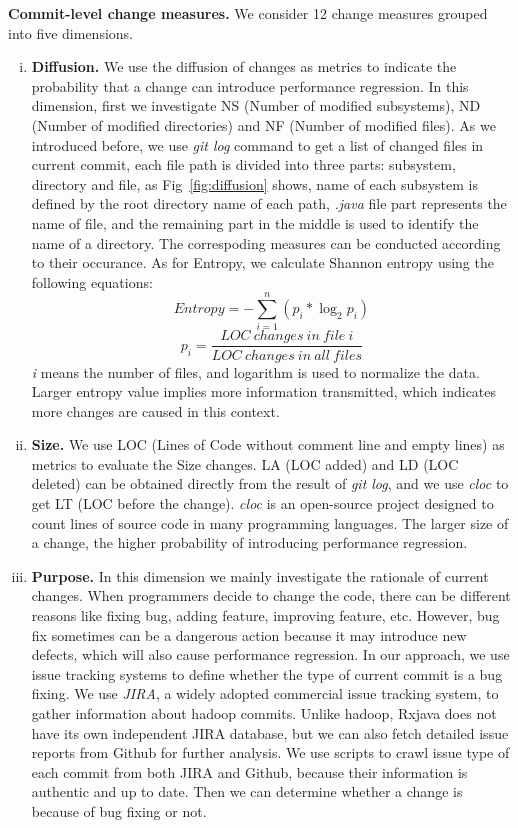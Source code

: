  \textbf{Commit-level change measures.} We consider 12 change measures grouped into five dimensions.
\begin{enumerate}[(i)]
	\item \noindent
	\textbf{Diffusion.} We use the diffusion of changes as metrics to indicate the probability that a change can introduce performance regression. In this dimension, first we investigate NS (Number of modified subsystems), ND (Number of modified directories) and NF (Number of modified files). As we introduced before, we use \textit{git log} command to get a list of changed files in current commit, each file path is divided into three parts: subsystem, directory and file, as Fig~\ref{fig:diffusion} shows, name of each subsystem is defined by the root directory name of each path, \textit{.java} file part represents the name of file, and the remaining part in the middle is used to identify the name of a directory. The correspoding measures can be conducted according to their occurance. As for Entropy, we calculate Shannon entropy using the following equations:
	\begin{equation}
		Entropy = - \sum_{i=1}^{n}\left (p_{i}\ast \log_2 p_{i} \right )
	\end{equation}
	\begin{equation}
		p_{i} =\frac{LOC\ changes\ in\ file\ i}{LOC\ changes\ in\ all\ files}
	\end{equation}
	\textit{i} means the number of files, and logarithm is used to normalize the data. Larger entropy value implies more information transmitted, which indicates more changes are caused in this context.
	
	\item \noindent
	\textbf{Size.}
	We use LOC (Lines of Code without comment line and empty lines) as metrics to evaluate the Size changes. LA (LOC added) and LD (LOC deleted) can be obtained directly from the result of \textit{git log}, and we use \textit{cloc} to get LT (LOC before the change). \textit{cloc} is an open-source project designed to count lines of source code in many programming languages. The larger size of a change,  the higher probability of introducing performance regression.
	
	\item \noindent
	\textbf{Purpose.}
	In this dimension we mainly investigate the rationale of current changes. When programmers decide to change the code, there can be different reasons like fixing bug, adding feature, improving feature, etc.
	However, bug fix sometimes can be a dangerous action because it may introduce new defects, which will also cause performance regression. In our approach, we use issue tracking systems to define whether the type of current commit is a bug fixing. We use \textit{JIRA}, a widely adopted commercial issue tracking system, to gather information about hadoop commits. Unlike hadoop, Rxjava does not have its own independent JIRA database, but we can also fetch detailed issue reports from Github for further analysis. We use scripts to crawl issue type of each commit from both JIRA and Github, because their information is authentic and up to date. Then we can determine whether a change is because of bug fixing or not.
	

\end{enumerate}
